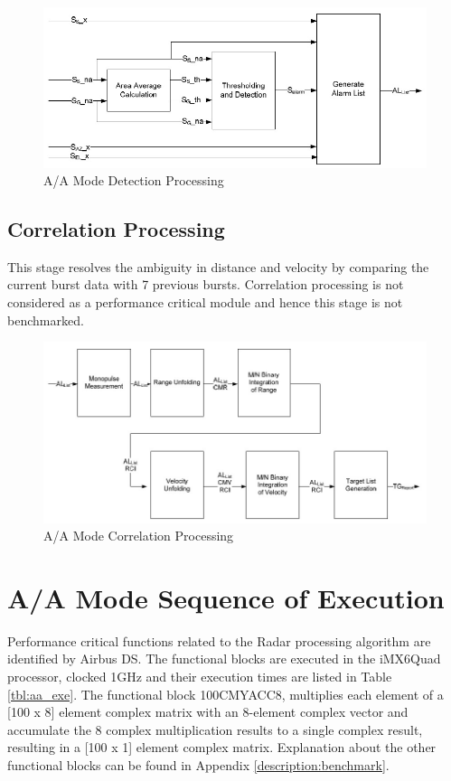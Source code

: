 \begin{figure}[h!]
	\centering
	\includegraphics[width=140mm]{figures/aa_det}
	\caption{A/A Mode Detection Processing}
	\label{fig:bg_related_work:aa_det}
\end{figure}


\subsection{Correlation Processing}
This stage resolves the ambiguity in distance and velocity by comparing the current burst data with 7 previous bursts. Correlation processing is not considered as a performance critical module and hence this stage is not benchmarked. 

\begin{figure}[h!]
	\centering
	\includegraphics[width=140mm]{figures/aa_corr}
	\caption{A/A Mode Correlation Processing}
	\label{fig:bg_related_work:aa_corr}
\end{figure}
\FloatBarrier

\section{A/A Mode Sequence of Execution}
\label{sec:ch2:benchmark_results}
Performance critical functions related to the Radar processing algorithm are identified by Airbus DS. The functional blocks are executed in the iMX6Quad processor, clocked 1GHz and their execution times are listed in Table \ref{tbl:aa_exe}. The functional block 100CMYACC8, multiplies each element of a [100 x 8] element complex matrix with an 8-element complex vector and accumulate the 8 complex multiplication results to a single complex result, resulting in a [100 x 1] element complex matrix. Explanation about the other functional blocks can be found in Appendix \ref{description:benchmark}.

